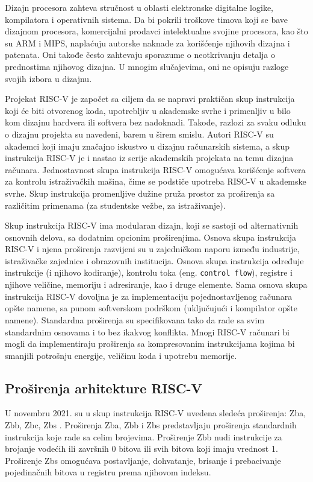 \documentclass[12pt,oneside]{memoir}
\begin{document}
Dizajn procesora zahteva stručnost u oblasti elektronske digitalne logike, kompilatora i operativnih sistema. Da bi pokrili troškove timova koji se bave dizajnom procesora, 
komercijalni prodavci intelektualne svojine procesora, kao što su ARM i MIPS, naplaćuju autorske naknade za korišćenje njihovih dizajna i patenata. Oni takođe često zahtevaju sporazume o neotkrivanju detalja o prednostima njihovog dizajna. U mnogim slučajevima, oni ne opisuju razloge svojih izbora u dizajnu.

Projekat RISC-V je započet sa ciljem da se napravi praktičan skup instrukcija koji će biti otvorenog koda, upotrebljiv u akademske svrhe i primenljiv u bilo kom dizajnu hardvera ili softvera bez nadoknadi. Takođe, razlozi za svaku odluku o dizajnu projekta su navedeni, barem u širem smislu. Autori RISC-V su akademci koji imaju značajno iskustvo u dizajnu računarskih sistema, a skup instrukcija RISC-V je i nastao iz serije akademskih projekata na temu dizajna računara. Jednostavnost skupa instrukcija RISC-V omogućava korišćenje softvera za kontrolu istraživačkih mašina, čime se podstiče upotreba RISC-V u akademske svrhe. Skup instrukcija promenljive dužine pruža prostor za proširenja sa različitim primenama (za studentske vežbe, za istraživanje).

Skup instrukcija RISC-V ima modularan dizajn, koji se sastoji od alternativnih osnovnih delova, sa dodatnim opcionim proširenjima. Osnova skupa instrukcija RISC-V i njena proširenja razvijeni su u zajedničkom naporu između industrije, istraživačke zajednice i obrazovnih institucija. Osnova skupa instrukcija određuje instrukcije (i njihovo kodiranje), kontrolu toka (eng. \texttt{control flow}), registre i njihove veličine, memoriju i adresiranje, kao i druge elemente. Sama osnova skupa instrukcija RISC-V dovoljna je za implementaciju pojednostavljenog računara opšte namene, sa punom softverskom podrškom (uključujući i kompilator opšte namene). Standardna proširenja su specifikovana tako da rade sa svim standardnim osnovama i to bez ikakvog konflikta. Mnogi RISC-V računari bi mogli da implementiraju proširenja sa kompresovanim instrukcijama kojima bi smanjili potrošnju energije, veličinu koda i upotrebu memorije.

\subsection{Proširenja arhitekture RISC-V}
U novembru 2021. su u skup instrukcija RISC-V uvedena sledeća proširenja: Zba, Zbb, Zbc, Zbs \cite{riscv_bitmanip}.
Proširenja Zba, Zbb i Zbs predstavljaju proširenja standardnih instrukcija koje rade sa celim brojevima. Proširenje Zbb nudi instrukcije za brojanje vodećih ili završnih 0 bitova ili svih bitova koji imaju vrednost 1. Proširenje Zbs omogućava postavljanje, dohvatanje, brisanje i prebacivanje pojedinačnih bitova u registru prema njihovom indeksu. 
\end{document}
